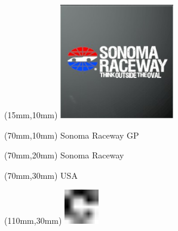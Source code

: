 \null\newpage
\begin{textblock*}{50mm}(15mm,10mm)%
\includegraphics[width=50mm]{LG/2015-05-20_00096.png}
\end{textblock*}
\begin{textblock*}{130mm}(70mm,10mm)%
{\fontsize{20}{20}\selectfont Sonoma Raceway GP}\\
\end{textblock*}
\begin{textblock*}{120mm}(70mm,20mm)%
{\fontsize{16}{16}\selectfont Sonoma Raceway}\\
\end{textblock*}
\begin{textblock*}{120mm}(70mm,30mm)%
{\fontsize{12}{12}\selectfont USA}
\end{textblock*}
\begin{textblock*}{30mm}(110mm,30mm)%
\centering
\includegraphics[height=15mm]{icons/fa-rotate-right.pdf}
\end{textblock*}
